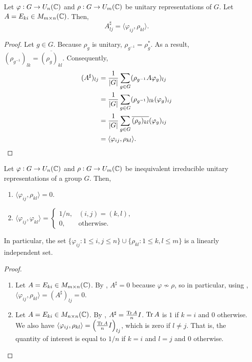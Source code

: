 		\begin{flem}
			\label{lem: schur orthogonality lemma}
			Let $\varphi : G \to U_n(\mathbb{C})$ and $\rho : G \to U_m(\mathbb{C})$ be unitary representations of $G$. Let $A = E_{ki} \in M_{m \times n}(\mathbb{C})$. Then,
			\[ A_{lj}^\sharp = \langle \varphi_{ij} , \rho_{kl} \rangle. \]
		\end{flem}
		\begin{proof}
			Let $g \in G$. Because $\rho_g$ is unitary, $\rho_{g^{-1}} = \rho_g^*$. As a result, $(\rho_{g^{-1}})_{lk} = \overline{(\rho_g)_{kl}}$. Consequently,
			\begin{align*}
				(A^\sharp)_{lj} &= \frac{1}{|G|} \sum_{g \in G} (\rho_{g^{-1}} A \varphi_g)_{lj} \\
					&= \frac{1}{|G|} \sum_{g \in G} (\rho_{g^{-1}})_{lk} (\varphi_{g})_{ij} \\
					&= \frac{1}{|G|} \sum_{g \in G} \overline{(\rho_{g})_{kl}} (\varphi_{g})_{ij} \\
					&= \langle \varphi_{ij} , \rho_{kl} \rangle. \qedhere
			\end{align*}
		\end{proof}

		\begin{ftheo}
			\label{theo: schurs orthogonality relations}
			Let $\varphi : G \to U_n(\mathbb{C})$ and $\rho : G \to U_m(\mathbb{C})$ be inequivalent irreducible unitary representations of a group $G$. Then,
			\begin{enumerate}[label=(\alph*)]
				\item $\langle \varphi_{ij} , \rho_{kl} \rangle = 0$.
				\item $\langle \varphi_{ij} , \varphi_{kl} \rangle = \begin{cases} 1/n , & (i,j) = (k,l), \\ 0, & \text{otherwise.} \end{cases}$
			\end{enumerate}
			In particular, the set $\{ \varphi_{ij} : 1 \le i,j \le n \} \cup \{ \rho_{kl} : 1 \le k,l \le m \}$ is a linearly independent set.
		\end{ftheo}
		\begin{proof}
			\phantom{pain}
			\begin{enumerate}[label = (\alph*)]
				\item 
				Let $A = E_{ki} \in M_{m \times n}(\mathbb{C})$. By , $A^\sharp = 0$ because $\varphi \not\sim \rho$, so in particular, using , $\langle \varphi_{ij} , \rho_{kl} \rangle = (A^\sharp)_{lj} = 0$.

				\item
				Let $A = E_{ki} \in M_{n \times n}(\mathbb{C})$. By , $A^\sharp = \frac{\operatorname{Tr} A}{n} I$. $\operatorname{Tr} A$ is $1$ if $k = i$ and $0$ otherwise. We also have $\langle \varphi_{ij} , \rho_{kl} \rangle = \left(\frac{\operatorname{Tr} A}{n} I\right)_{lj}$, which is zero if $l \ne j$. That is, the quantity of interest is equal to $1/n$ if $k = i$ and $l = j$ and $0$ otherwise. \qedhere
			\end{enumerate}
		\end{proof}

